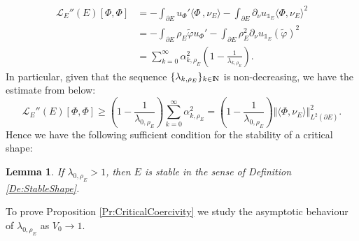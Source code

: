 \documentclass{article}
\newcommand{\N}{\textnormal{I\kern-0.21emN}}
\renewcommand{\geq}{\geqslant}
\newtheorem{lemma}[material]{Lemma}
\def\p{{\varphi}}
\numberwithin{equation}{section}
\begin{document}
 \begin{align*}
\mathscr L_{E}''(E)[\Phi,\Phi]&=-\int_{\partial E} u_\Phi'\langle \Phi\,, \nu_E\rangle
-\int_{\partial E}\partial_\nu u_{\mathds 1_E}\langle \Phi, \nu_E\rangle^2
\\&=-\int_{\partial E}\rho_E \tilde\p u_\Phi'
-\int_{\partial E}\rho_E^2\partial_\nu u_{\mathds 1_E}\left(\tilde \p\right)^2
\\&=\sum_{k=0}^\infty \alpha_{k,\rho_E}^2 \left(1-\frac1{\lambda_{k,\rho_E}}\right).
\end{align*}
In particular, given that the sequence $\{\lambda_{k,\rho_E}\}_{k\in \N}$ is non-decreasing, we have the estimate from below:
\begin{equation}\label{Eq:LowerEstimateLagrangian} \mathscr L_E''(E)[\Phi,\Phi]\geq  \left(1-\frac1{\lambda_{0,\rho_E}}\right)\sum_{k=0}^\infty\alpha_{k,\rho_E}^2= \left(1-\frac1{\lambda_{0,\rho_E}}\right)\Vert \langle \Phi,\nu_E\rangle\Vert_{L^2(\partial E)}^2.\end{equation}
Hence we have the following sufficient condition for the stability of a critical shape:
\begin{lemma}\label{Le:SufficientStable}
If $\lambda_{0,\rho_E}>1$, then $E$ is stable in the sense of Definition \ref{De:StableShape}. 
\end{lemma}

To prove Proposition \ref{Pr:CriticalCoercivity} we study the asymptotic behaviour of $\lambda_{0,\rho_E}$ as $V_0\to 1$.
\end{document}

